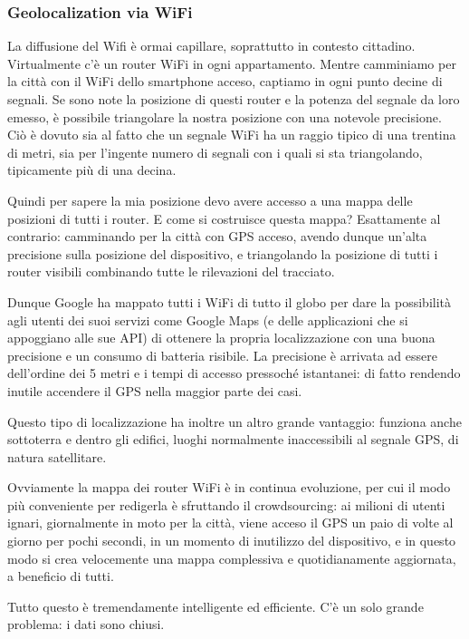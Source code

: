 \subsubsection*{Geolocalization via WiFi}
La diffusione del Wifi è ormai capillare, soprattutto in contesto cittadino. Virtualmente c'è un router WiFi in ogni appartamento. Mentre camminiamo per la città con il WiFi dello smartphone acceso, captiamo in ogni punto decine di segnali. Se sono note la posizione di questi router e la potenza del segnale da loro emesso, è possibile triangolare la nostra posizione con una notevole precisione. Ciò è dovuto sia al fatto che un segnale WiFi ha un raggio tipico di una trentina di metri, sia per l'ingente numero di segnali con i quali si sta triangolando, tipicamente più di una decina.

Quindi per sapere la mia posizione devo avere accesso a una mappa delle posizioni di tutti i router. E come si costruisce questa mappa? Esattamente al contrario: camminando per la città con GPS acceso, avendo dunque un'alta precisione sulla posizione del dispositivo, e triangolando la posizione di tutti i router visibili combinando tutte le rilevazioni del tracciato.

Dunque Google ha mappato tutti i WiFi di tutto il globo per dare la possibilità agli utenti dei suoi servizi come Google Maps (e delle applicazioni che si appoggiano alle sue API) di ottenere la propria localizzazione con una buona precisione e un consumo di batteria risibile. La precisione è arrivata ad essere dell'ordine dei 5 metri e i tempi di accesso pressoché istantanei: di fatto rendendo inutile accendere il GPS nella maggior parte dei casi.

Questo tipo di localizzazione ha inoltre un altro grande vantaggio: funziona anche sottoterra e dentro gli edifici, luoghi normalmente inaccessibili al segnale GPS, di natura satellitare.

Ovviamente la mappa dei router WiFi è in continua evoluzione, per cui il modo più conveniente per redigerla è sfruttando il crowdsourcing: ai milioni di utenti ignari, giornalmente in moto per la città, viene acceso il GPS un paio di volte al giorno per pochi secondi, in un momento di inutilizzo del dispositivo, e in questo modo si crea velocemente una mappa complessiva e quotidianamente aggiornata, a beneficio di tutti.

Tutto questo è tremendamente intelligente ed efficiente. C'è un solo grande problema: i dati sono chiusi.

